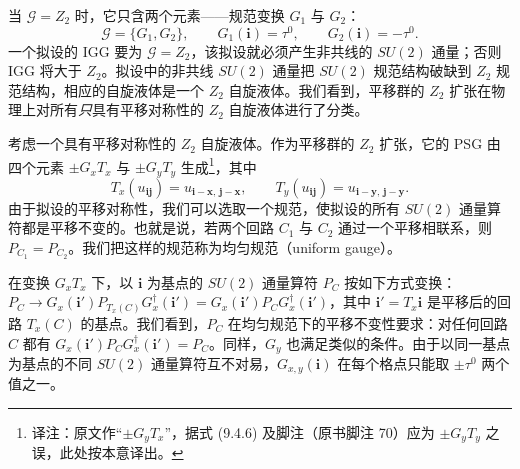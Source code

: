 当 $\mathcal{G}=Z_2$ 时，它只含两个元素——规范变换 $G_1$ 与 $G_2$：
\begin{equation*}
\mathcal{G}=\{G_1,G_2\},\qquad G_1(\pmb{i})=\tau^0,\qquad G_2(\pmb{i})=-\tau^0.
\end{equation*}
一个拟设的 IGG 要为 $\mathcal{G}=Z_2$，该拟设就必须产生非共线的 $SU(2)$ 通量；否则 IGG 将大于 $Z_2$。拟设中的非共线 $SU(2)$ 通量把 $SU(2)$ 规范结构破缺到 $Z_2$ 规范结构，相应的自旋液体是一个 $Z_2$ 自旋液体。我们看到，平移群的 $Z_2$ 扩张在物理上对所有\emph{只}具有平移对称性的 $Z_2$ 自旋液体进行了分类。

考虑一个具有平移对称性的 $Z_2$ 自旋液体。作为平移群的 $Z_2$ 扩张，它的 PSG 由四个元素 $\pm G_xT_x$ 与 $\pm G_yT_y$ 生成\footnote{译注：原文作“$\pm G_yT_x$”，据式 (9.4.6) 及脚注（原书脚注 70）应为 $\pm G_yT_y$ 之误，此处按本意译出。}，其中
\begin{equation*}
T_x(u_{\pmb{ij}})=u_{\pmb{i}-\pmb{x},\,\pmb{j}-\pmb{x}},\qquad T_y(u_{\pmb{ij}})=u_{\pmb{i}-\pmb{y},\,\pmb{j}-\pmb{y}}.
\end{equation*}
由于拟设的平移对称性，我们可以选取一个规范，使拟设的所有 $SU(2)$ 通量算符都是平移不变的。也就是说，若两个回路 $C_1$ 与 $C_2$ 通过一个平移相联系，则 $P_{C_1}=P_{C_2}$。我们把这样的规范称为均匀规范（uniform gauge）。

在变换 $G_xT_x$ 下，以 $\pmb{i}$ 为基点的 $SU(2)$ 通量算符 $P_C$ 按如下方式变换：$P_C\to G_x(\pmb{i}')P_{T_x(C)}G_x^{\dagger}(\pmb{i}')\allowbreak=G_x(\pmb{i}')P_CG_x^{\dagger}(\pmb{i}')$，其中 $\pmb{i}'=T_x\pmb{i}$ 是平移后的回路 $T_x(C)$ 的基点。我们看到，$P_C$ 在均匀规范下的平移不变性要求：对任何回路 $C$ 都有 $G_x(\pmb{i}')P_CG_x^{\dagger}(\pmb{i}')=P_C$。同样，$G_y$ 也满足类似的条件。由于以同一基点为基点的不同 $SU(2)$ 通量算符互不对易，$G_{x,y}(\pmb{i})$ 在每个格点只能取 $\pm\tau^0$ 两个值之一。

